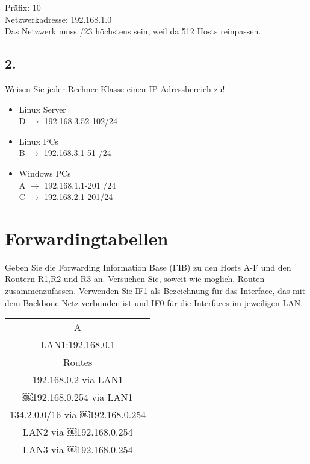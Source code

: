 \documentclass[paper=a4, fontsize=11pt]{scrartcl}
\numberwithin{equation}{section}
\numberwithin{figure}{section}
\numberwithin{table}{section}
\begin{document}
Präfix: 10 \\
Netzwerkadresse: 192.168.1.0 \\

Das Netzwerk muss /23 höchstens sein, weil da 512 Hosts reinpassen. 

\subsection{2.}
Weisen Sie jeder Rechner Klasse einen IP-Adressbereich zu! \\

\begin{itemize}
\item Linux Server \\
D $\rightarrow$ 192.168.3.52-102/24 \\
\item Linux PCs \\
B $\rightarrow$ 192.168.3.1-51 /24 \\
\item Windows PCs \\
A $\rightarrow$ 192.168.1.1-201 /24 \\ 
C $\rightarrow$ 192.168.2.1-201/24 \\ 
\end{itemize}

\section{Forwardingtabellen}
Geben Sie die Forwarding Information Base (FIB) zu den Hosts A-F und den Routern R1,R2 und R3 an. Versuchen Sie, soweit wie möglich, Routen zusammenzufassen. Verwenden Sie IF1 als Bezeichnung für das Interface, das mit dem Backbone-Netz verbunden ist und IF0 für die Interfaces im jeweiligen LAN. \\

\begin{tabular}{|c|}
\hline
A\\
LAN1:192.168.0.1\\
Routes\\
192.168.0.2 via LAN1\\
￼192.168.0.254 via LAN1\\
134.2.0.0/16 via ￼192.168.0.254\\
LAN2 via ￼192.168.0.254\\
LAN3 via ￼192.168.0.254
\\\hline
\end{tabular}\newline\newline
\end{document}
